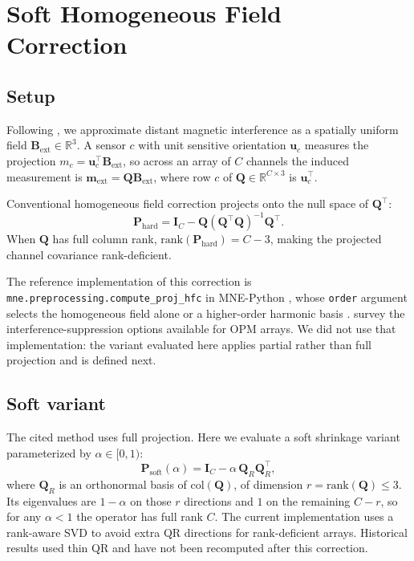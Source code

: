 \section{Soft Homogeneous Field Correction}\label{sec:soft-hfc}

\subsection{Setup}
Following \citet{tierney2021hfc}, we approximate distant magnetic interference as a spatially uniform field $\mathbf{B}_{\mathrm{ext}} \in \mathbb{R}^{3}$. A sensor $c$ with unit
sensitive orientation $\mathbf{u}_{c}$ measures the projection
$m_{c} = \mathbf{u}_{c}^{\top}\mathbf{B}_{\mathrm{ext}}$, so across an array of $C$
channels the induced measurement is $\mathbf{m}_{\mathrm{ext}} = \mathbf{Q}\mathbf{B}_{\mathrm{ext}}$,
where row $c$ of $\mathbf{Q} \in \mathbb{R}^{C \times 3}$ is $\mathbf{u}_{c}^{\top}$.

Conventional homogeneous field correction \citep{tierney2021hfc} projects onto the null space of
$\mathbf{Q}^{\top}$:
\[
\mathbf{P}_{\mathrm{hard}} = \mathbf{I}_{C} - \mathbf{Q}(\mathbf{Q}^{\top}\mathbf{Q})^{-1}\mathbf{Q}^{\top}.
\]
When $\mathbf{Q}$ has full column rank, $\mathrm{rank}(\mathbf{P}_{\mathrm{hard}}) = C - 3$, making the projected channel covariance rank-deficient.

The reference implementation of this correction is \texttt{mne.preprocessing.compute\_proj\_hfc} in MNE-Python \citep{mneopmtutorial}, whose \texttt{order} argument selects the homogeneous field alone or a higher-order harmonic basis \citep{tierney2022harmonic}. \citet{seymour2022interference} survey the interference-suppression options available for OPM arrays. We did not use that implementation: the variant evaluated here applies partial rather than full projection and is defined next.

\subsection{Soft variant}
The cited method uses full projection. Here we evaluate a soft shrinkage variant parameterized by $\alpha \in [0,1)$:
\[
\mathbf{P}_{\mathrm{soft}}(\alpha) = \mathbf{I}_{C} - \alpha\,\mathbf{Q}_{R}\mathbf{Q}_{R}^{\top},
\]
where $\mathbf{Q}_{R}$ is an orthonormal basis of $\mathrm{col}(\mathbf{Q})$, of dimension $r=\mathrm{rank}(\mathbf{Q})\leq 3$. Its eigenvalues are $1-\alpha$ on those $r$ directions and $1$ on the remaining $C-r$, so for any $\alpha < 1$ the operator has full rank $C$. The current implementation uses a rank-aware SVD to avoid extra QR directions for rank-deficient arrays. Historical results used thin QR and have not been recomputed after this correction.

